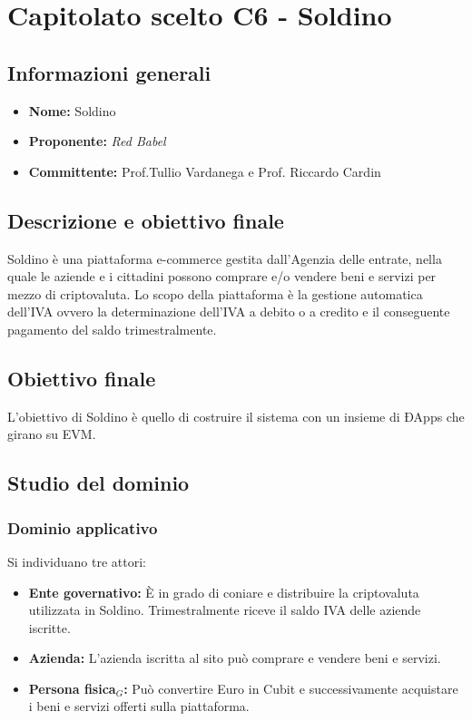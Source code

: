 \section{Capitolato scelto C6 - Soldino}
\subsection{Informazioni generali}
% 
\begin{itemize}
\item
\textbf{Nome:} Soldino
\item
\textbf{Proponente:} \textit{Red Babel} 
\item
\textbf{Committente:} Prof.Tullio Vardanega e Prof. Riccardo Cardin
\end{itemize}
\subsection{Descrizione e obiettivo finale}
Soldino è una piattaforma e-commerce gestita dall'Agenzia delle entrate, nella 
quale le aziende e i cittadini possono comprare e/o vendere beni e servizi per mezzo 
di criptovaluta. Lo scopo della piattaforma è la gestione automatica dell'IVA 
ovvero la determinazione dell'IVA a debito o a credito e il conseguente pagamento
del saldo trimestralmente.
\subsection{Obiettivo finale}
L'obiettivo di Soldino è quello di costruire il sistema con un insieme di ÐApps 
che girano su EVM.

\subsection{Studio del dominio}
\subsubsection{Dominio applicativo}
Si individuano tre attori:
\begin{itemize}	
	\item \textbf{Ente governativo: }\`E in grado di coniare e distribuire la 
	criptovaluta utilizzata in Soldino. Trimestralmente riceve il saldo IVA 
	delle aziende iscritte.
	\item \textbf{Azienda: } L'azienda iscritta al sito può comprare e vendere 
	beni e servizi. %
	\item \textbf{Persona fisica$_{G}$: }Può convertire Euro in Cubit e successivamente acquistare
	i beni e servizi offerti sulla piattaforma.
\end{itemize}
